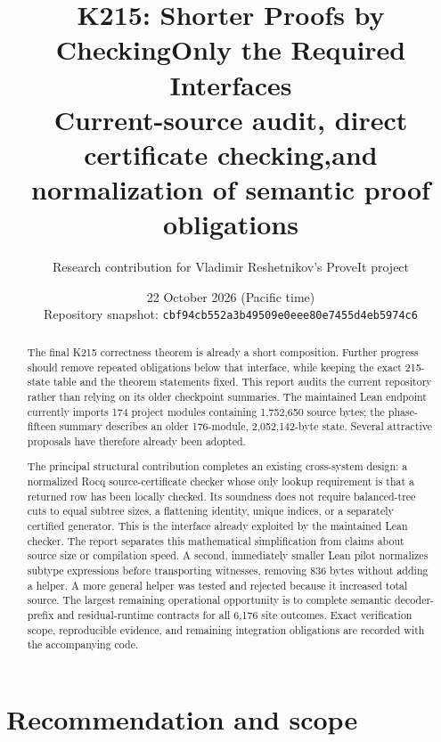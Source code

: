 \documentclass[11pt]{article}
\title{\textbf{K215: Shorter Proofs by Checking\newline Only the Required Interfaces}\\[0.6em]
\large Current-source audit, direct certificate checking,\newline and normalization of semantic proof obligations}
\author{Research contribution for Vladimir Reshetnikov's ProveIt project}
\date{22 October 2026 (Pacific time)\\[0.3em]\small Repository snapshot: \texttt{cbf94cb552a3b49509e0eee80e7455d4eb5974c6}}
\theoremstyle{remark}\newtheorem{remark}[theorem]{Remark}
\begin{document}
\maketitle
\begin{abstract}
The final K215 correctness theorem is already a short composition. Further progress should remove repeated obligations below that interface, while keeping the exact 215-state table and the theorem statements fixed. This report audits the current repository rather than relying on its older checkpoint summaries. The maintained Lean endpoint currently imports 174 project modules containing 1,752,650 source bytes; the phase-fifteen summary describes an older 176-module, 2,052,142-byte state. Several attractive proposals have therefore already been adopted.

The principal structural contribution completes an existing cross-system design: a normalized Rocq source-certificate checker whose only lookup requirement is that a returned row has been locally checked. Its soundness does not require balanced-tree cuts to equal subtree sizes, a flattening identity, unique indices, or a separately certified generator. This is the interface already exploited by the maintained Lean checker. The report separates this mathematical simplification from claims about source size or compilation speed. A second, immediately smaller Lean pilot normalizes subtype expressions before transporting witnesses, removing 836 bytes without adding a helper. A more general helper was tested and rejected because it increased total source. The largest remaining operational opportunity is to complete semantic decoder-prefix and residual-runtime contracts for all 6,176 site outcomes. Exact verification scope, reproducible evidence, and remaining integration obligations are recorded with the accompanying code.
\end{abstract}
\newpage
\tableofcontents
\newpage

\section{Recommendation and scope}
\end{document}
